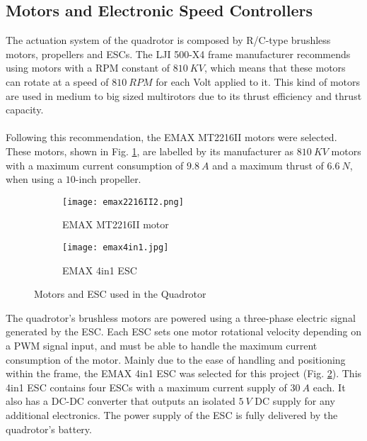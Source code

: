 \subsection{Motors and Electronic Speed Controllers}
The actuation system of the quadrotor is composed by R/C-type brushless motors, propellers and ESCs. The LJI 500-X4 frame manufacturer recommends using motors with a RPM constant of $810\ KV$, which means that these motors can rotate at a speed of $810\ RPM$ for each Volt applied to it. This kind of motors are used in medium to big sized multirotors due to its thrust efficiency and thrust capacity.
\\\\
Following this recommendation, the EMAX MT2216II motors were selected. These motors, shown in Fig. \ref{fig:emaxmotor}, are labelled by its manufacturer as $810\ KV$ motors with a maximum current consumption of $9.8\ A$ and a maximum thrust of $6.6\ N$, when using a $10$-inch propeller.
\begin{figure}[H]
\begin{subfigure}{.5\linewidth}
\centering
\texttt{[image: emax2216II2.png]}    
\caption{EMAX MT2216II motor} 
\label{fig:emaxmotor}
\end{subfigure}
\begin{subfigure}{.5\linewidth}
\centering
\texttt{[image: emax4in1.jpg]}    
\caption{EMAX 4in1 ESC} 
\label{fig:emaxESC}
\end{subfigure}
\caption{Motors and ESC used in the Quadrotor\protect\footnotemark}
\label{fig:motorandesc}
\end{figure}
The quadrotor's brushless motors are powered using a three-phase electric signal generated by the ESC. Each ESC sets one motor rotational velocity depending on a PWM signal input, and must be able to handle the maximum current consumption of the motor. Mainly due to the ease of handling and positioning within the frame, the EMAX 4in1 ESC was selected for this project (Fig. \ref{fig:emaxESC}). This 4in1 ESC contains four ESCs with a maximum current supply of $30\ A$ each. It also has a DC-DC converter that outputs an isolated $5\ V$ DC supply for any additional electronics. The power supply of the ESC is fully delivered by the quadrotor's battery.

